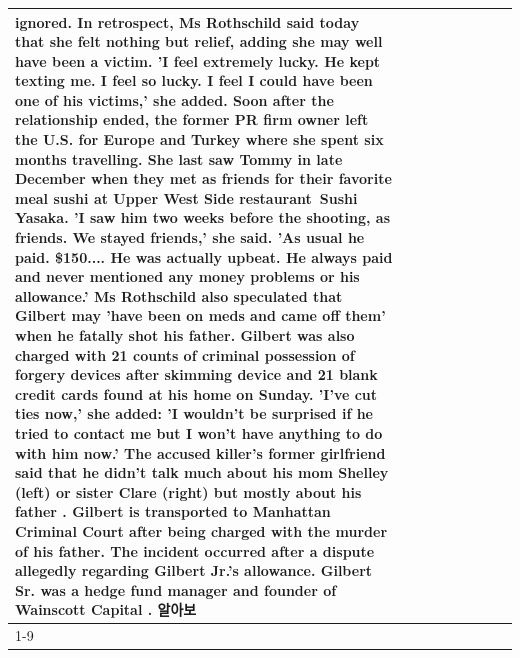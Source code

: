 \begin{table}[H]
\begin{tabular}{lllrlllll}
ignored. In retrospect, Ms Rothschild said today that she felt nothing but relief, adding she may well have been a victim. 'I feel extremely lucky. He kept texting me. I feel so lucky. I feel I could have been one of his victims,' she added. Soon after the relationship ended, the former PR firm owner left the U.S. for Europe and Turkey where she spent six months  travelling. She last saw Tommy in late December when they met as friends for their favorite meal sushi at Upper West Side restaurant Sushi Yasaka. 'I saw him two weeks before the shooting, as friends. We stayed friends,' she said. 'As usual he paid. \$150.... He was actually upbeat. He always paid and never mentioned any money problems or his allowance.' Ms Rothschild also speculated that Gilbert may 'have been on meds and came off them' when he fatally shot his father. Gilbert was also charged with 21 counts of criminal possession of forgery devices after skimming device and 21 blank credit cards found at his home on Sunday. 'I've cut ties now,' she added: 'I wouldn’t be surprised if he tried to contact me but I won’t have anything to do with him now.' The accused killer's former girlfriend said that he didn't talk much about his mom Shelley (left) or sister Clare (right) but mostly about his father . Gilbert is transported to Manhattan Criminal Court  after being charged with the murder of his father. The incident occurred after a dispute allegedly regarding Gilbert Jr.'s allowance. Gilbert Sr. was a hedge fund manager and founder of Wainscott Capital . 알아보 \\
\cline{1-9}

\end{tabular}
\end{table}
